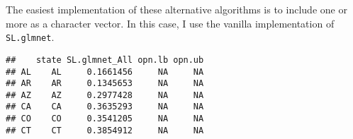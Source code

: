 \documentclass[]{article}
\newenvironment{Shaded}{\begin{snugshade}}{\end{snugshade}}
\newcommand{\KeywordTok}[1]{\textcolor[rgb]{0.13,0.29,0.53}{\textbf{#1}}}
\newcommand{\DataTypeTok}[1]{\textcolor[rgb]{0.13,0.29,0.53}{#1}}
\newcommand{\DecValTok}[1]{\textcolor[rgb]{0.00,0.00,0.81}{#1}}
\newcommand{\StringTok}[1]{\textcolor[rgb]{0.31,0.60,0.02}{#1}}
\newcommand{\OperatorTok}[1]{\textcolor[rgb]{0.81,0.36,0.00}{\textbf{#1}}}
\newcommand{\NormalTok}[1]{#1}
\begin{document}
The easiest implementation of these alternative algorithms is to include
one or more as a character vector. In this case, I use the vanilla
implementation of \texttt{SL.glmnet}.

\begin{Shaded}
\end{Shaded}

\begin{Shaded}
\end{Shaded}

\begin{verbatim}
##    state SL.glmnet_All opn.lb opn.ub
## AL    AL     0.1661456     NA     NA
## AR    AR     0.1345653     NA     NA
## AZ    AZ     0.2977428     NA     NA
## CA    CA     0.3635293     NA     NA
## CO    CO     0.3541205     NA     NA
## CT    CT     0.3854912     NA     NA
\end{verbatim}
\end{document}

